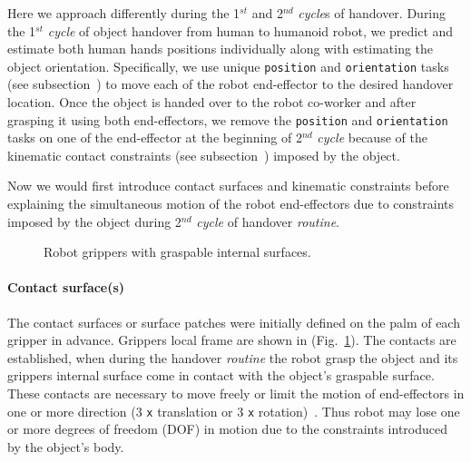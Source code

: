 Here we approach differently during the 1${}^{st}$ and 2${}^{nd}$ \textit{cycle}s of handover. During the 1${}^{st}$ \textit{cycle} of object handover from human to humanoid robot, we predict and estimate both human hands positions individually along with estimating the object orientation. Specifically, we use unique \texttt{position} and \texttt{orientation} tasks (see subsection~) to move each of the robot end-effector to the desired handover location. Once the object is handed over to the robot co-worker and after grasping it using both end-effectors, we remove the \texttt{position} and \texttt{orientation} tasks on one of the end-effector at the beginning of 2${}^{nd}$ \textit{cycle} because of the kinematic contact constraints (see subsection~) imposed by the object. 

Now we would first introduce contact surfaces and kinematic constraints before explaining the simultaneous motion of the robot end-effectors due to constraints imposed by the object during 2$^{nd}$ \textit{cycle} of handover \textit{routine}.

\begin{figure}[hptb]
	\caption{Robot grippers with graspable internal surfaces.}
	\label{fig:gripper-intern}
\end{figure}


\paragraph*{Contact surface(s)} 

The contact surfaces or surface patches were initially defined on the palm of each gripper in advance. Grippers local frame are shown in (Fig.~\ref{fig:gripper-intern}). The contacts are established, when during the handover \textit{routine} the robot grasp the object and its grippers internal surface come in contact with the object's graspable surface. These contacts are necessary to move freely or limit the motion of end-effectors in one or more direction (3 \texttt{x} translation or 3 \texttt{x} rotation)~\cite{bouyarmane2018multi}. Thus robot may lose one or more degrees of freedom (DOF) in motion due to the constraints introduced by the object's body.

